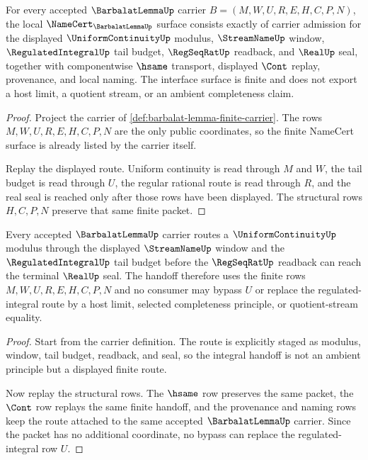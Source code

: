 \begin{theorem}
\label{thm:barbalat-lemma-finite-namecert-obligations}
For every accepted $\BarbalatLemmaUp$ carrier $B=(M,W,U,R,E,H,C,P,N)$, the local $\NameCert_{\BarbalatLemmaUp}$ surface consists exactly of carrier admission for the displayed $\UniformContinuityUp$ modulus, $\StreamNameUp$ window, $\RegulatedIntegralUp$ tail budget, $\RegSeqRatUp$ readback, and $\RealUp$ seal, together with componentwise $\hsame$ transport, displayed $\Cont$ replay, provenance, and local naming. The interface surface is finite and does not export a host limit, a quotient stream, or an ambient completeness claim.
\end{theorem}
\begin{proof}
Project the carrier of \autoref{def:barbalat-lemma-finite-carrier}. The rows $M,W,U,R,E,H,C,P,N$ are the only public coordinates, so the finite NameCert surface is already listed by the carrier itself.

Replay the displayed route. Uniform continuity is read through $M$ and $W$, the tail budget is read through $U$, the regular rational route is read through $R$, and the real seal is reached only after those rows have been displayed. The structural rows $H,C,P,N$ preserve that same finite packet.
\end{proof}

\begin{theorem}
\label{thm:barbalat-lemma-uniform-continuity-integral-handoff}
Every accepted $\BarbalatLemmaUp$ carrier routes a $\UniformContinuityUp$ modulus through the displayed $\StreamNameUp$ window and the $\RegulatedIntegralUp$ tail budget before the $\RegSeqRatUp$ readback can reach the terminal $\RealUp$ seal. The handoff therefore uses the finite rows $M,W,U,R,E,H,C,P,N$ and no consumer may bypass $U$ or replace the regulated-integral route by a host limit, selected completeness principle, or quotient-stream equality.
\end{theorem}
\begin{proof}
Start from the carrier definition. The route is explicitly staged as modulus, window, tail budget, readback, and seal, so the integral handoff is not an ambient principle but a displayed finite route.

Now replay the structural rows. The $\hsame$ row preserves the same packet, the $\Cont$ row replays the same finite handoff, and the provenance and naming rows keep the route attached to the same accepted $\BarbalatLemmaUp$ carrier. Since the packet has no additional coordinate, no bypass can replace the regulated-integral row $U$.
\end{proof}

